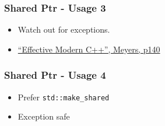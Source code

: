\subsubsection{Shared Ptr - Usage 3}\label{shared-ptr---usage-3}

\begin{itemize}
\itemsep1pt\parskip0pt
\item
  Watch out for exceptions.
\item
  \href{https://www.amazon.co.uk/Effective-Modern-Specific-Ways-Improve/dp/1491903996/ref=sr_1_1?ie=UTF8\&qid=1484571499\&sr=8-1\&keywords=Effective+Modern+C\%2B\%2B}{``Effective
  Modern C++'', Meyers, p140}
\end{itemize}

\begin{Shaded}
\begin{Highlighting}[]
   
\NormalTok{\{}
\NormalTok{\}}
 
\NormalTok{\{}
\NormalTok{\}}
 
\NormalTok{\{}
    \NormalTok{,}\NormalTok{)),}
                             \NormalTok{);}
\NormalTok{\}}
\end{Highlighting}
\end{Shaded}

\subsubsection{Shared Ptr - Usage 4}\label{shared-ptr---usage-4}

\begin{itemize}
\itemsep1pt\parskip0pt
\item
  Prefer \texttt{std::make\_shared}
\item
  Exception safe
\end{itemize}

